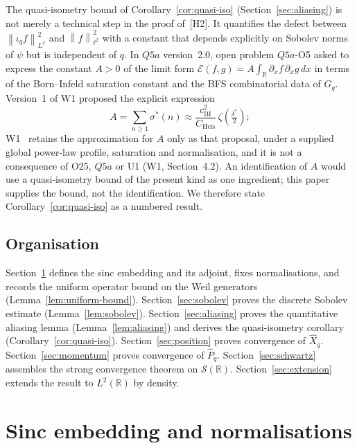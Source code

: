 \documentclass[12pt,a4paper]{article}
\newcommand{\ltwo}{L^2(\mathbb{R})}
\newcommand{\Schwartz}{\mathcal{S}(\mathbb{R})}
\newcommand{\iotaq}{\iota_q}
\newcommand{\Xhat}{\hat{X}_q}
\newcommand{\Phat}{\hat{P}_q}
\newcommand{\norm}[1]{\left\|#1\right\|}
\begin{document}
      The quasi-isometry bound of Corollary~\ref{cor:quasi-iso} (Section~\ref{sec:aliasing}) is not
      merely a technical step in the proof of~[H2].
      It quantifies the defect between $\norm{\iotaq f}_{L^2}^2$ and $\norm{f}_{\ell^2}^2$
      with a constant that depends explicitly on Sobolev norms of $\psi$ but is independent of $q$.
      In $Q5a$ version~2.0, open problem $Q5a$-O5 asked to express the constant $A > 0$ of the limit
      form $\mathcal{E}(f,g) = A\int_{\mathbb{R}} \partial_x f\,\partial_x g\,dx$ in terms of the
      Born--Infeld saturation constant and the BFS combinatorial data of $G_q$.
      Version~1 of W1 proposed the explicit expression
      \[
        A = \sum_{n \geq 1} \sigma^*(n) \approx \frac{c_{\mathrm{BI}}^2}{C_{\mathrm{Heis}}} \,
        \zeta\!\left(\tfrac{\delta^*}{2}\right);
      \]
      W1~\cite{Beau2026w1} retains the approximation for $A$ only as that proposal, under a
      supplied global power-law profile, saturation and normalisation, and it is not a
      consequence of O25, $Q5a$ or U1 (W1, Section~4.2).
      An identification of $A$ would use a quasi-isometry bound of the present kind as one
      ingredient; this paper supplies the bound, not the identification.
      We therefore state Corollary~\ref{cor:quasi-iso} as a numbered result.

    \subsection{Organisation}

      Section~\ref{sec:embedding} defines the sinc embedding and its adjoint,
      fixes normalisations, and records the uniform operator bound on the Weil generators
      (Lemma~\ref{lem:uniform-bound}).
      Section~\ref{sec:sobolev} proves the discrete Sobolev estimate (Lemma~\ref{lem:sobolev}).
      Section~\ref{sec:aliasing} proves the quantitative aliasing lemma (Lemma~\ref{lem:aliasing})
      and derives the quasi-isometry corollary (Corollary~\ref{cor:quasi-iso}).
      Section~\ref{sec:position} proves convergence of $\Xhat$.
      Section~\ref{sec:momentum} proves convergence of $\Phat$.
      Section~\ref{sec:schwartz} assembles the strong convergence theorem on $\Schwartz$.
      Section~\ref{sec:extension} extends the result to $\ltwo$ by density.

      \newpage
  \section{Sinc embedding and normalisations}
    \label{sec:embedding}
\end{document}
